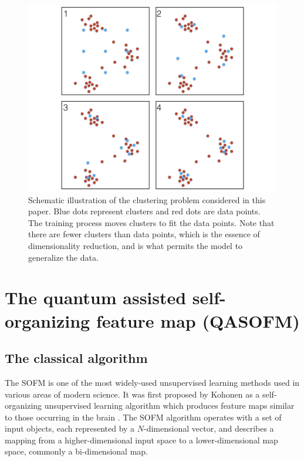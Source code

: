 \documentclass[pra,showkeys,twocolumn,showpacs]{revtex4-1}
\begin{document}
\begin{figure}
  	\includegraphics[width=0.95\columnwidth]{sofm_fitting.png}
	\caption{
		Schematic illustration of the clustering problem considered in this paper.  
		Blue dots represent clusters and red dots are data points. 
		The training process moves clusters to fit the data points. 
		Note that there are fewer clusters than data points, 
		which is the essence of dimensionality reduction, 
		and is what permits the model to generalize the data.
	}
	\label{fig:sofm_fitting}
\end{figure}


























\section{The quantum assisted self-organizing feature map (QASOFM)}
\label{sec:qasofm}



\subsection{The classical algorithm}


The SOFM is one of the most widely-used unsupervised learning methods used in various areas of modern science. 
It was first proposed by Kohonen as a self-organizing unsupervised learning algorithm which produces feature maps similar to those occurring in the brain \cite{solan2001}. 
The SOFM algorithm operates with a set of input objects, each represented by a $N$-dimensional vector, 
and describes a mapping from a higher-dimensional input space to a lower-dimensional map space, commonly a bi-dimensional map.
\end{document}

